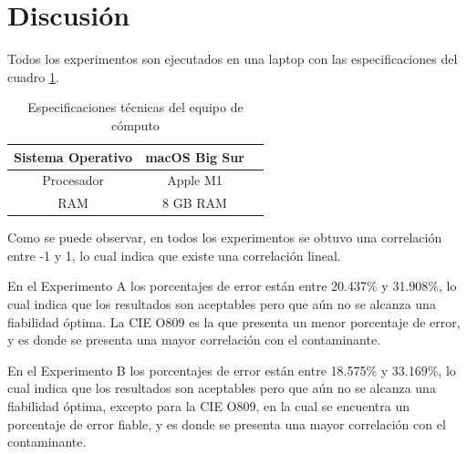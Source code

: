 
\clearpage
\section{Discusión}
Todos los experimentos son ejecutados en una laptop con las especificaciones del cuadro \ref{tab:Especificaciones técnicas del PC}.
\begin{table}[H]
	{\centering
		\caption{Especificaciones técnicas del equipo de cómputo}
		\begin{tabular}{|c|c|c|}
			\hline
			Sistema Operativo & macOS Big Sur\\
			\hline
			Procesador & Apple M1\\
			\hline
			RAM & 8 GB RAM\\
			\hline
		\end{tabular}

	\label{tab:Especificaciones técnicas del PC}
	}
\end{table}

Como se puede observar, en todos los experimentos se obtuvo una correlación entre -1 y 1, lo cual indica que existe una correlación lineal.

En el Experimento A los porcentajes de error están entre 20.437\% y 31.908\%, lo cual indica que los resultados son aceptables pero que aún no se alcanza una fiabilidad óptima. La CIE \citep{r9} O809 es la que presenta un menor porcentaje de error, y es donde se presenta una mayor correlación con el contaminante.

En el Experimento B los porcentajes de error están entre 18.575\% y 33.169\%, lo cual indica que los resultados son aceptables pero que aún no se alcanza una fiabilidad óptima, excepto para la CIE \citep{r9} O809, en la cual se encuentra un porcentaje de error fiable, y es donde se presenta una mayor correlación con el contaminante.


